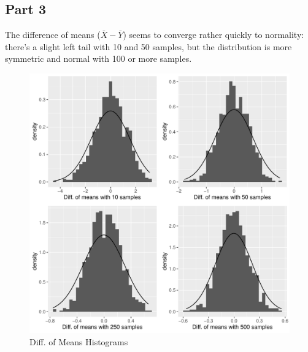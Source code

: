 \documentclass[12pt]{article}
\begin{document}
\subsection*{Part 3}

The difference of means ($\bar{X} - \bar{Y}$) seems to converge rather quickly to normality: there's a slight left tail with 10 and 50 samples, but the distribution is more symmetric and normal with 100 or more samples.

\begin{figure}[H]
\caption{Diff. of Means Histograms}
\label{fig:diff}
\centering
\includegraphics[width = .7\textwidth]{hw1_diffmeans.pdf}
\end{figure}




\end{document}
